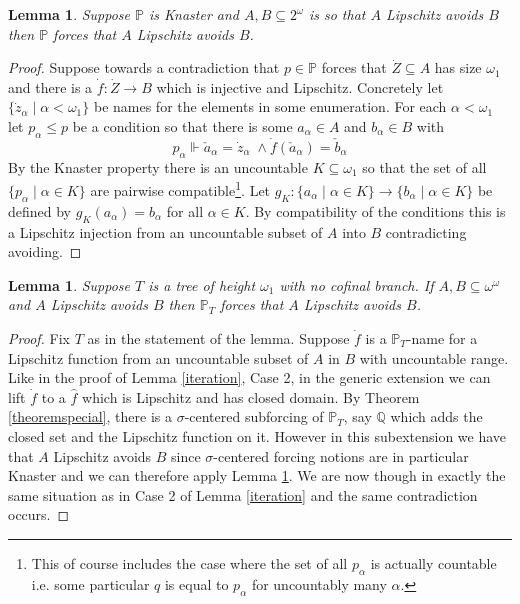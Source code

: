 \documentclass[leqno,11pt]{amsart}
\newtheorem{lemma}[theorem]{Lemma}
\theoremstyle{definition}
\theoremstyle{remark}
\def\forces{\Vdash}
\def\baire{\omega^\omega}
\def\Q{\mathbb Q}
\def\P{\mathbb P}
\begin{document}
\begin{lemma}\label{knaster}
    Suppose $\P$ is Knaster and $A, B \subseteq 2^\omega$ is so that $A$ Lipschitz avoids $B$ then $\P$ forces that $A$ Lipschitz avoids $B$. 
\end{lemma}

\begin{proof}
    Suppose towards a contradiction that $p \in \P$ forces that $\dot{Z} \subseteq A$ has size $\omega_1$ and there is a $\dot{f}:\dot{Z} \to B$ which is injective and Lipschitz. Concretely let $\{\dot{z}_\alpha \; | \; \alpha < \omega_1\}$ be names for the elements in some enumeration. For each $\alpha  < \omega_1$ let $p_\alpha \leq p$ be a condition so that there is some $a_\alpha \in A$ and $b_\alpha \in B$ with $$p_\alpha \forces \check{a}_\alpha = \dot{z}_\alpha \; \land \dot{f}(\check{a}_\alpha) = \check{b}_\alpha$$
By the Knaster property there is an uncountable $K \subseteq \omega_1$ so that the set of all $\{p_\alpha \; | \; \alpha \in K\}$ are pairwise compatible\footnote{This of course includes the case where the set of all $p_\alpha$ is actually countable i.e. some particular $q$ is equal to $p_\alpha$ for uncountably many $\alpha$.}. Let $g_K:\{a_\alpha \; | \; \alpha \in K\} \to \{b_\alpha\; | \; \alpha \in K\}$ be defined by $g_K (a_\alpha) = b_\alpha$ for all $\alpha \in K$. By compatibility of the conditions this is a Lipschitz injection from an uncountable subset of $A$ into $B$ contradicting avoiding.
\end{proof}

\begin{lemma}\label{PT}
    Suppose $T$ is a tree of height $\omega_1$ with no cofinal branch. If $A, B \subseteq \baire$ and $A$ Lipschitz avoids $B$ then $\P_T$ forces that $A$ Lipschitz avoids $B$.
\end{lemma}

\begin{proof}
    Fix $T$ as in the statement of the lemma. Suppose $\dot{f}$ is a $\P_T$-name for a Lipschitz function from an uncountable subset of $A$ in $B$ with uncountable range. Like in the proof of Lemma \ref{iteration}, Case 2, in the generic extension we can lift $\dot{f}$ to a $\hat{f}$ which is Lipschitz and has closed domain. By Theorem \ref{theoremspecial}, there is a $\sigma$-centered subforcing of $\P_T$, say $\Q$ which adds the closed set and the Lipschitz function on it. However in this subextension we have that $A$ Lipschitz avoids $B$ since $\sigma$-centered forcing notions are in particular Knaster and we can therefore apply Lemma \ref{knaster}. We are now though in exactly the same situation as in Case 2 of Lemma \ref{iteration} and the same contradiction occurs. 
\end{proof}
\end{document}
